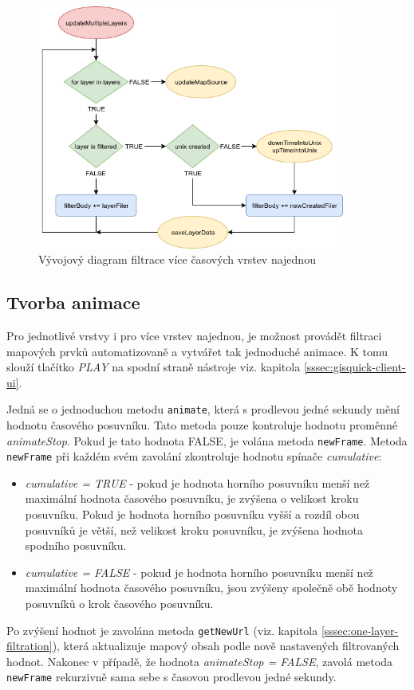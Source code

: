 \begin{figure}[h!]
\centering
\includegraphics[width=0.9\textwidth]{./img/getMultipleLayers.png}
\caption{Vývojový diagram filtrace více časových vrstev najednou \cite{flow-chart}}
\label{fig:multiple-chart}
\end{figure}

\newpage
\subsection{Tvorba animace}
\label{sssec:animation}

Pro jednotlivé vrstvy i pro více vrstev najednou, je možnost
provádět filtraci mapových prvků automatizovaně a vytvářet tak
jednoduché animace. K tomu slouží tlačítko \textit{PLAY} na spodní
straně nástroje viz. kapitola \ref{sssec:gisquick-client-ui}.

Jedná se o jednoduchou metodu \verb|animate|, která s prodlevou jedné
sekundy mění hodnotu časového posuvníku. Tato metoda pouze kontroluje
hodnotu proměnné \textit{animateStop}. Pokud je tato hodnota FALSE, je
volána metoda \verb|newFrame|. Metoda \verb|newFrame| při každém svém
zavolání zkontroluje hodnotu spínače \textit{cumulative}:
\begin{itemize}
\item\textit{cumulative = TRUE} - pokud je hodnota horního posuvníku
menší než maximální hodnota časového posuvníku, je zvýšena o velikost
kroku posuvníku. Pokud je hodnota horního posuvníku vyšší a rozdíl obou
posuvníků je větší, než velikost kroku posuvníku, je zvýšena hodnota
spodního posuvníku.
\item\textit{cumulative = FALSE} - pokud je hodnota horního posuvníku
menší než maximální hodnota časového posuvníku, jsou zvýšeny
společně obě hodnoty posuvníků o krok časového posuvníku.
\end{itemize}
Po zvýšení hodnot je zavolána metoda \verb|getNewUrl| (viz. kapitola
\ref{sssec:one-layer-filtration}), která aktualizuje mapový obsah podle
nově nastavených filtrovaných hodnot. Nakonec v případě, že hodnota
\textit{animateStop = FALSE}, zavolá metoda \verb|newFrame| rekurzivně sama sebe s časovou prodlevou jedné sekundy.

